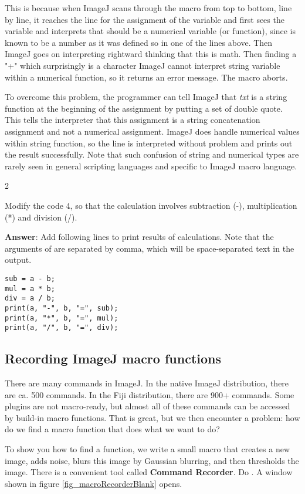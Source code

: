 This is because when ImageJ scans through the macro from top to bottom, line by line, 
it reaches the line for the assignment of the variable  and first sees the variable  and interprets that  should be a numerical variable 
(or function), since  is known to be a number as it was defined so in one of the lines above. Then ImageJ goes on interpreting rightward thinking that this is math. Then finding a "+" which surprisingly is a character
ImageJ cannot interpret string variable within a numerical function, so it returns an error message. The macro aborts.

To overcome this problem, the programmer can tell ImageJ that 
\textit{txt} is a string function at the beginning of the assignment 
by putting a set of double quote. This tells the interpreter that this assignment is a string concatenation assignment and not a numerical assignment. 
ImageJ does handle numerical values within string function, 
so the line is interpreted without problem and prints out the result successfully. Note that such confusion of string and numerical types are rarely seen in general scripting languages and specific to ImageJ macro language.

\begin{indentexercise}
{2}

\item Modify the code 4, so that the calculation involves subtraction (-), multiplication (*) and division (/).

\item \textbf{Answer}: Add following lines to print results of calculations. Note that the arguments of  are separated by comma, which will be space-separated text in the output.  
\begin{lstlisting}[numbers=none]
sub = a - b;
mul = a * b;
div = a / b;
print(a, "-", b, "=", sub);
print(a, "*", b, "=", mul);
print(a, "/", b, "=", div);
\end{lstlisting}

\end{indentexercise}

\subsection{Recording ImageJ macro functions}
There are many commands in ImageJ. In the native ImageJ distribution, there are ca. 500 commands. In the Fiji distribution, there are 900+ commands. Some plugins are not macro-ready, but almost all of these commands can be accessed by build-in macro functions. That is great, but we then encounter a problem: how do we find a macro function that does what we want to do?

To show you how to find a function, we write a small macro that creates a new image, adds noise, blurs this image by Gaussian blurring, and then thresholds the image. There is a convenient tool called \textbf{Command Recorder}. 
Do . A window shown in figure
\ref{fig_macroRecorderBlank} opens.